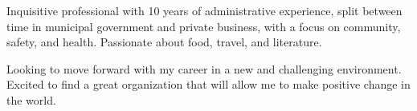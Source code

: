 

\begin{cvparagraph}

Inquisitive professional with 10 years of administrative experience, split between time in municipal government 
and private business, with a focus on community, safety, and health.
Passionate about food, travel, and literature.

Looking to move forward with my career in a new and challenging environment.
Excited to find a great organization that will allow me to make positive change in the world.
\end{cvparagraph}
